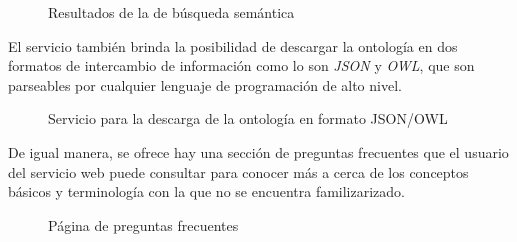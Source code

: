 \begin{figure}[!ht]
	\centering
    \caption{Resultados de la de b\'usqueda sem\'antica}
    \label{paginaResultados}
\end{figure}

El servicio tambi\'en brinda la posibilidad de descargar la ontolog\'ia en dos formatos de intercambio de informaci\'on como lo son \textit{JSON} y \textit{OWL}, que son parseables por cualquier lenguaje de programaci\'on de alto nivel.\newline

\begin{figure}[!ht]
	\centering
    \caption{Servicio para la descarga de la ontolog\'ia en formato JSON/OWL}
    \label{paginaExportar}
\end{figure}

De igual manera, se ofrece hay una secci\'on de preguntas frecuentes que el usuario del servicio web puede consultar para conocer m\'as a cerca de los conceptos b\'asicos y terminolog\'ia con la que no se encuentra familizarizado.\newline

\begin{figure}[!ht]
	\centering
    \caption{P\'agina de preguntas frecuentes}
    \label{paginaPreguntas}
\end{figure}

